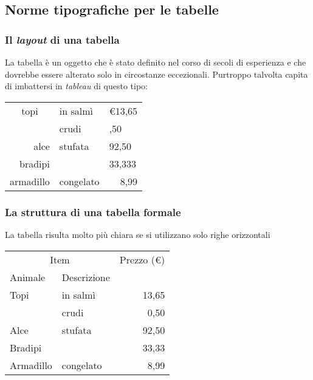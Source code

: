 \documentclass[svgnames,%
	ucs,%
	pdftex]{guitbeamer}
\begin{document}
\subsection{Norme tipografiche per le tabelle}
\begin{frame}
  \frametitle{Il \textit{layout} di una tabella}
	La tabella \`e un oggetto che \`e stato definito nel corso di secoli di esperienza e che dovrebbe essere alterato solo in circostanze eccezionali. Purtroppo talvolta capita di imbattersi in \textit{tableau} di questo tipo: 
	\begin{LaTeXoutput}\centering
		\begin{tabular}{||r|ll||} \hline
		\multicolumn{1}{||c|}{topi}	& in salm\`i	& \euro{}13,65 \\ \cline{2-3}
			& crudi		& ,50 \\ \hline
		alce	& stufata	& 92,50 \\ \cline{1-1} \cline{3-3}
		bradipi	&		& 33,333 \\ \hline
		armadillo & congelato	& \multicolumn{1}{r||}{8,99} \\ \hline
		\end{tabular}
	\end{LaTeXoutput}
\end{frame}
\begin{frame}
  \frametitle{La struttura di una tabella formale}
	La tabella risulta molto pi\`u chiara se si utilizzano solo righe orizzontali
	\begin{LaTeXoutput}\centering
		\begin{tabular}{@{}llr@{}} \hline
		\multicolumn{2}{c}{Item} &  Prezzo (\euro{})\\\cline{1-2}
		Animale & Descrizione	& \\ \hline
		Topi	& in salm\`i	& 13,65 \\ 
			& crudi		& 0,50 \\ 
		Alce	& stufata	& 92,50 \\ 
		Bradipi	&		& 33,33 \\ 
		Armadillo & congelato	& 8,99 \\ \hline
		\end{tabular}
	\end{LaTeXoutput}
\end{frame}
\end{document}
